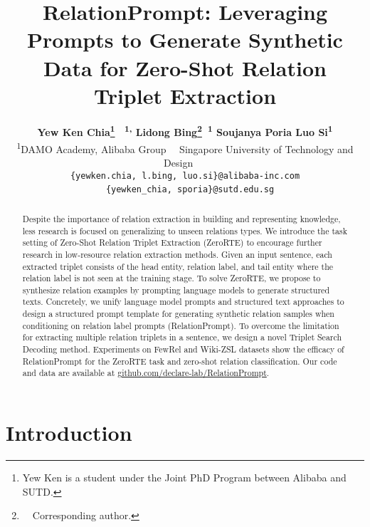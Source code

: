 \documentclass[11pt]{article}
\title{RelationPrompt: Leveraging Prompts to Generate Synthetic Data for Zero-Shot Relation Triplet Extraction}
\author{
\textbf{
Yew Ken Chia\thanks{Yew Ken is a student under the Joint PhD Program between Alibaba and SUTD. 
}
~\textsuperscript{\rm 1,}\quad
Lidong Bing\thanks{~~Corresponding author.}~\textsuperscript{\rm 1}\quad
Soujanya Poria\textsuperscript{\rm }\quad
Luo Si\textsuperscript{\rm 1}}\\
\textsuperscript{\rm 1}DAMO Academy, Alibaba Group~~
\textsuperscript{\rm } Singapore University of Technology and Design ~~\\
{\tt\{yewken.chia, l.bing, luo.si\}@alibaba-inc.com} \\~~{\tt\{yewken\_chia, sporia\}@sutd.edu.sg}}
\begin{document}
\maketitle

\begin{abstract}
Despite the importance of relation extraction in building and representing knowledge, less research is focused on generalizing to unseen relations types.
We introduce the task setting of Zero-Shot Relation Triplet Extraction (ZeroRTE) to encourage further research in low-resource relation extraction methods. 
Given an input sentence, each extracted triplet consists of the head entity, relation label, and tail entity where the relation label is not seen at the training stage.
To solve ZeroRTE, we propose to synthesize relation examples by prompting language models to generate structured texts.
Concretely, we unify language model prompts and structured text approaches to design a structured prompt template for generating synthetic relation samples when conditioning on relation label prompts (RelationPrompt).
To overcome the limitation for extracting multiple relation triplets in a sentence, we design a novel Triplet Search Decoding method.
Experiments on FewRel and Wiki-ZSL datasets show the efficacy of RelationPrompt for the ZeroRTE task and zero-shot relation classification. 
Our code and data are available at
\href{https://github.com/declare-lab/RelationPrompt}{github.com/declare-lab/RelationPrompt}.


\end{abstract}



\section{Introduction}
\end{document}
